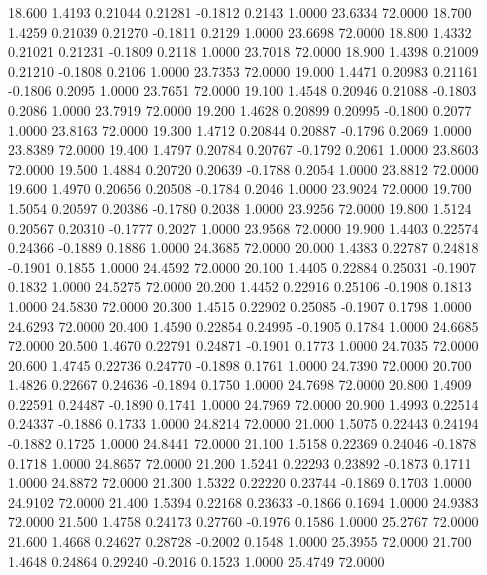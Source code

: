   18.600   1.4193   0.21044   0.21281  -0.1812   0.2143   1.0000  23.6334  72.0000
  18.700   1.4259   0.21039   0.21270  -0.1811   0.2129   1.0000  23.6698  72.0000
  18.800   1.4332   0.21021   0.21231  -0.1809   0.2118   1.0000  23.7018  72.0000
  18.900   1.4398   0.21009   0.21210  -0.1808   0.2106   1.0000  23.7353  72.0000
  19.000   1.4471   0.20983   0.21161  -0.1806   0.2095   1.0000  23.7651  72.0000
  19.100   1.4548   0.20946   0.21088  -0.1803   0.2086   1.0000  23.7919  72.0000
  19.200   1.4628   0.20899   0.20995  -0.1800   0.2077   1.0000  23.8163  72.0000
  19.300   1.4712   0.20844   0.20887  -0.1796   0.2069   1.0000  23.8389  72.0000
  19.400   1.4797   0.20784   0.20767  -0.1792   0.2061   1.0000  23.8603  72.0000
  19.500   1.4884   0.20720   0.20639  -0.1788   0.2054   1.0000  23.8812  72.0000
  19.600   1.4970   0.20656   0.20508  -0.1784   0.2046   1.0000  23.9024  72.0000
  19.700   1.5054   0.20597   0.20386  -0.1780   0.2038   1.0000  23.9256  72.0000
  19.800   1.5124   0.20567   0.20310  -0.1777   0.2027   1.0000  23.9568  72.0000
  19.900   1.4403   0.22574   0.24366  -0.1889   0.1886   1.0000  24.3685  72.0000
  20.000   1.4383   0.22787   0.24818  -0.1901   0.1855   1.0000  24.4592  72.0000
  20.100   1.4405   0.22884   0.25031  -0.1907   0.1832   1.0000  24.5275  72.0000
  20.200   1.4452   0.22916   0.25106  -0.1908   0.1813   1.0000  24.5830  72.0000
  20.300   1.4515   0.22902   0.25085  -0.1907   0.1798   1.0000  24.6293  72.0000
  20.400   1.4590   0.22854   0.24995  -0.1905   0.1784   1.0000  24.6685  72.0000
  20.500   1.4670   0.22791   0.24871  -0.1901   0.1773   1.0000  24.7035  72.0000
  20.600   1.4745   0.22736   0.24770  -0.1898   0.1761   1.0000  24.7390  72.0000
  20.700   1.4826   0.22667   0.24636  -0.1894   0.1750   1.0000  24.7698  72.0000
  20.800   1.4909   0.22591   0.24487  -0.1890   0.1741   1.0000  24.7969  72.0000
  20.900   1.4993   0.22514   0.24337  -0.1886   0.1733   1.0000  24.8214  72.0000
  21.000   1.5075   0.22443   0.24194  -0.1882   0.1725   1.0000  24.8441  72.0000
  21.100   1.5158   0.22369   0.24046  -0.1878   0.1718   1.0000  24.8657  72.0000
  21.200   1.5241   0.22293   0.23892  -0.1873   0.1711   1.0000  24.8872  72.0000
  21.300   1.5322   0.22220   0.23744  -0.1869   0.1703   1.0000  24.9102  72.0000
  21.400   1.5394   0.22168   0.23633  -0.1866   0.1694   1.0000  24.9383  72.0000
  21.500   1.4758   0.24173   0.27760  -0.1976   0.1586   1.0000  25.2767  72.0000
  21.600   1.4668   0.24627   0.28728  -0.2002   0.1548   1.0000  25.3955  72.0000
  21.700   1.4648   0.24864   0.29240  -0.2016   0.1523   1.0000  25.4749  72.0000
